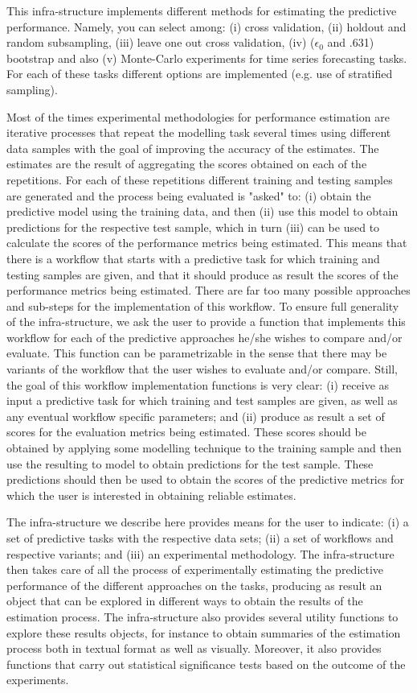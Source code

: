 \documentclass[10pt,a4paper]{article}\usepackage[]{graphicx}\usepackage[]{color}
\begin{document}
This infra-structure implements different methods for estimating the
predictive performance. Namely, you can select among: (i) cross
validation, (ii) holdout and random subsampling, (iii) leave one out
cross validation, (iv) ($\epsilon_0$ and .631) bootstrap and also (v)
Monte-Carlo experiments for time series forecasting tasks. For each of
these tasks different options are implemented (e.g. use of stratified
sampling).

Most of the times experimental methodologies for performance estimation are iterative
processes that repeat the modelling task several times using different
data samples with the goal of improving the accuracy of the
estimates. The estimates are the result of aggregating the scores
obtained on each of the repetitions. For each of these
repetitions different training and testing samples are generated and
the process being evaluated is "asked" to: (i) obtain the predictive
model using the training data, and then (ii) use this model to obtain
predictions for the respective test sample, which in turn (iii) can be
used to calculate the scores of the performance metrics being
estimated. This means that there is a workflow that starts with a
predictive task for which training and testing samples are given, and
that it should produce as result the scores of the performance metrics
being estimated. There are far too many possible approaches and
sub-steps for the implementation of this workflow.  To ensure full
generality of the infra-structure, we ask the user to provide a
function that implements this workflow for each of the predictive
approaches he/she wishes to compare and/or evaluate. This function can
be parametrizable in the sense that there may be variants of the
workflow that the user wishes to evaluate and/or compare. Still, the
goal of this workflow implementation functions is very clear: (i)
receive as input a predictive task for which training  and  test
samples are given, as well as any eventual workflow specific parameters; and
(ii) produce as result a set of scores for the evaluation metrics
being estimated. These scores should be obtained by applying some
modelling technique to the training sample and then use the resulting
to model to obtain predictions for the test sample. These predictions
should then be used to obtain the scores of the predictive metrics for which the
user is interested in obtaining reliable estimates.

The infra-structure we describe here provides means for the user to
indicate: (i) a set of predictive tasks with the respective data sets;
(ii) a set of workflows and respective variants; and (iii) an
experimental methodology. The infra-structure then takes care of all
the process of experimentally estimating the predictive performance of the different approaches on
the tasks, producing as result an object that can be
explored in different ways to obtain the results of the estimation process.
The infra-structure also provides several utility functions
to explore these results objects, for instance to
obtain summaries of the estimation process both in textual format as well as
visually. Moreover, it also provides functions that carry out
statistical significance tests based on the outcome of the
experiments. 
\end{document}
